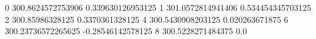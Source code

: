 0 300.8624572753906 0.339630126953125
1 301.0572814941406 0.534454345703125
2 300.85986328125 0.3370361328125
4 300.5430908203125 0.020263671875
6 300.23736572265625 -0.28546142578125
8 300.5228271484375 0.0
